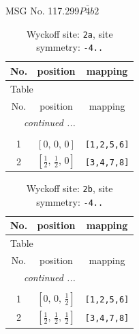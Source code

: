 \documentclass[fleqn,8pt]{jsarticle}
\begin{document}
\setcounter{MaxMatrixCols}{32}

\renewcommand{\tablename}{Table~}
\renewcommand{\figurename}{Figure~}
\begin{center}
\LARGE
MSG No. 117.299\quad$P\bar{4}b2$
\end{center}
\renewcommand{\arraystretch}{1.2}
\begin{longtable}{ccc}
\caption{Wyckoff site: {\tt 2a}, site symmetry: {\tt -4..}}
 \\
 \hline \hline
No. & position & mapping \\ \hline \endfirsthead

\multicolumn{2}{l}{\tablename\ \thetable{}} \\
 \hline \hline
No. & position & mapping \\ \hline \endhead

 \hline \hline
\multicolumn{2}{r}{\footnotesize\it continued ...} \\ \endfoot

 \hline \hline
\multicolumn{2}{r}{} \\ \endlastfoot

1 & $\left[ 0,\, 0,\, 0 \right]$ & {\tt [1,2,5,6]} \\ \hline
2 & $\left[ \frac{1}{2},\, \frac{1}{2},\, 0 \right]$ & {\tt [3,4,7,8]} \\
\end{longtable}
\renewcommand{\arraystretch}{1.2}
\begin{longtable}{ccc}
\caption{Wyckoff site: {\tt 2b}, site symmetry: {\tt -4..}}
 \\
 \hline \hline
No. & position & mapping \\ \hline \endfirsthead

\multicolumn{2}{l}{\tablename\ \thetable{}} \\
 \hline \hline
No. & position & mapping \\ \hline \endhead

 \hline \hline
\multicolumn{2}{r}{\footnotesize\it continued ...} \\ \endfoot

 \hline \hline
\multicolumn{2}{r}{} \\ \endlastfoot

1 & $\left[ 0,\, 0,\, \frac{1}{2} \right]$ & {\tt [1,2,5,6]} \\ \hline
2 & $\left[ \frac{1}{2},\, \frac{1}{2},\, \frac{1}{2} \right]$ & {\tt [3,4,7,8]} \\
\end{longtable}
\end{document}

